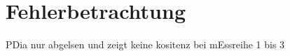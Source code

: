 \section{Fehlerbetrachtung}
\label{sec:fehler}


PDia nur abgelsen und zeigt keine kositenz bei mEssreihe 1 bis 3
